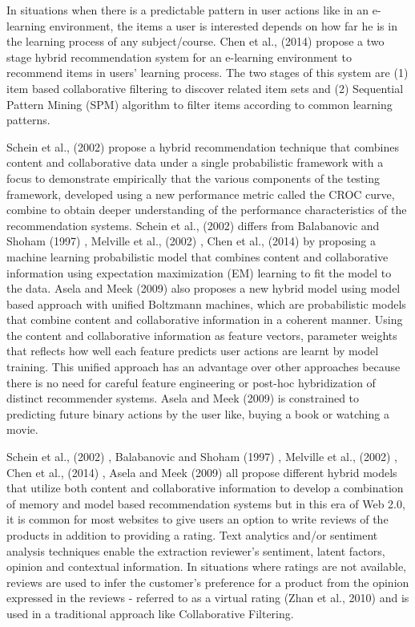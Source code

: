 \documentclass[12pt]{article}
\begin{document}
In situations when there is a predictable pattern in user actions like in an e-learning environment, the items a user is interested depends on how far he is in the learning process of any subject/course. Chen et al., (2014) \cite{chen} propose a two stage hybrid recommendation system for an e-learning environment to recommend items in users' learning process. The two stages of this system are (1) item based collaborative filtering to discover related item sets and (2) Sequential Pattern Mining (SPM) algorithm to filter items according to common learning patterns. 

Schein et al., (2002) \cite{schein} propose a hybrid recommendation technique that combines content and collaborative data under a single probabilistic framework with a focus to demonstrate empirically that the various components of the testing framework, developed using a new performance metric called the CROC curve, combine to obtain deeper understanding of the performance characteristics of the recommendation systems. Schein et al., (2002) \cite{schein} differs from Balabanovic and Shoham (1997) \cite{balabanovic}, Melville et al., (2002) \cite{melville}, Chen et al., (2014) \cite{chen} by proposing a machine learning probabilistic model that combines content and collaborative information using expectation maximization (EM) learning to fit the model to the data. Asela and Meek (2009) \cite{gunawardana} also proposes a new hybrid model using model based approach with unified Boltzmann machines, which are probabilistic models that combine content and collaborative information in a coherent manner. Using the content and collaborative information as feature vectors, parameter weights that reflects how well each feature predicts user actions are learnt by model training. This unified approach has an advantage over other approaches because there is no need for careful feature engineering or post-hoc hybridization of distinct recommender systems. Asela and Meek (2009) \cite{gunawardana} is constrained to predicting future binary actions by the user like, buying a book or watching a movie. \ 

Schein et al., (2002) \cite{schein}, Balabanovic and Shoham (1997) \cite{balabanovic}, Melville et al., (2002) \cite{melville}, Chen et al., (2014) \cite{chen}, Asela and Meek (2009) \cite{gunawardana} all propose different hybrid models that utilize both content and collaborative information to develop a combination of memory and model based recommendation systems but in this era of Web 2.0, it is common for most websites to give users an option to write reviews of the products in addition to providing a rating. Text analytics and/or sentiment analysis techniques enable the extraction reviewer's sentiment, latent factors, opinion and contextual information. In situations where ratings are not available, reviews are used to infer the customer's preference for a product from the opinion expressed in the reviews - referred to as a virtual rating (Zhan et al., 2010) \cite{zhang-narayan} and is used in a traditional approach like Collaborative Filtering. 
\end{document}
